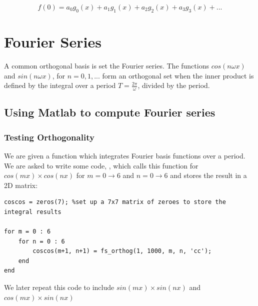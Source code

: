 \documentclass{article}
\begin{document}
$${f(0) = a_0g_0(x) + a_1g_1(x) + a_2g_2(x) + a_3g_3(x) + ... }$$
















\section{Fourier Series}

A common orthogonal basis is set the Fourier series. The functions $cos(n \omega x)$ and $sin(n \omega x)$, for  $n = 0, 1, ... $  form an orthogonal set when the inner product is defined by the integral over a period ${T = \frac{2\pi}{\omega}}$, divided by the period.















\subsection{Using Matlab to compute Fourier series}

\subsubsection{Testing Orthogonality}

We are given a function  which integrates Fourier basis functions over a period. We are asked to write some code, , which calls this function for $cos(m x) \times cos(n x)$ for ${m = 0 \to 6}$ and ${n = 0 \to 6}$ and stores the result in a 2D matrix:

\begin{lstlisting}
coscos = zeros(7); %set up a 7x7 matrix of zeroes to store the integral results

for m = 0 : 6
    for n = 0 : 6
        coscos(m+1, n+1) = fs_orthog(1, 1000, m, n, 'cc'); 
    end
end
\end{lstlisting}


We later repeat this code to include $sin(m x) \times sin(n x)$ and $cos(m x) \times sin(n x)$

\end{document}
